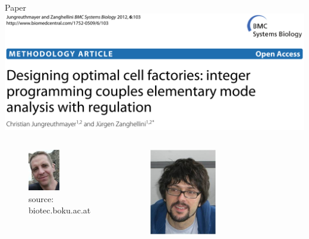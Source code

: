 \documentclass{beamer}
\begin{document}
\begin{frame}{Paper}
    \includegraphics[width=1\textwidth]{grafik/paper}
    \begin{columns}
      \begin{center}
        \begin{figure}
         \includegraphics[width=0.5\textwidth]{grafik/jungreuthmayer} \\
         \tiny{source: biotec.boku.ac.at}
        \end{figure}
      \end{center}
      \begin{center}
        \begin{figure}
         \includegraphics[width=0.5\textwidth]{grafik/zanghellini} \\

\end{figure}
\end{center}
\end{columns}
\end{frame}
\end{document}
